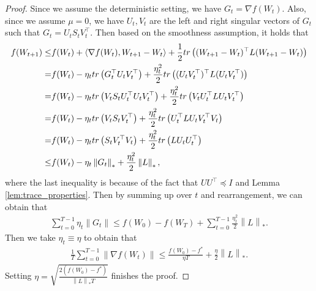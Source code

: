 \documentclass[10pt,a4paper]{amsart}
\newcommand{\Norm}[1]{\left\|#1\right\|}
\newcommand{\dotprod}[2]{\left\langle#1,#2\right\rangle}
\newcommand{\tr}[1]{{\rm tr}\left( #1 \right)}
\begin{document}
\begin{proof}
    Since we assume the deterministic setting, we have $G_t = \nabla f(W_t)$. Also, since we assume $\mu = 0$, we have $U_t,V_t$ are the left and right singular vectors of $G_t$ such that $G_t = U_t S_t V_t^\top$. Then based on the smoothness assumption, it holds that
    \begin{align*}
        f(W_{t+1}) \le& f(W_t) + \dotprod{\nabla f(W_t)}{W_{t+1} - W_t} + \frac{1}{2} \tr{(W_{t+1} - W_t)^\top L (W_{t+1} - W_t)} \\
        =& f(W_t) - \eta_t \tr{G_t^\top U_tV_t^\top} + \frac{\eta_t^2}{2} \tr{(U_tV_t^\top)^\top L (U_tV_t^\top)} \\
        =& f(W_t) - \eta_t \tr{V_t S_t U_t^\top U_tV_t^\top} + \frac{\eta_t^2}{2} \tr{V_t U_t^\top L U_tV_t^\top } \\
        =& f(W_t) - \eta_t \tr{V_t S_t V_t^\top} + \frac{\eta_t^2}{2} \tr{U_t^\top L U_tV_t^\top V_t } \\
        =& f(W_t) - \eta_t \tr{S_t V_t^\top V_t } + \frac{\eta_t^2}{2} \tr{ L U_t U_t^\top} \\
        \le& f(W_t) - \eta_t \Norm{G_t}_* + \frac{\eta_t^2}{2} \Norm{L}_* ,
    \end{align*}
    where the last inequality is because of the fact that $UU^\top \preceq I$ and Lemma \ref{lem:trace_properties}. Then by summing up over $t$ and rearrangement, we can obtain that
    \begin{align*}
        \sum_{t=0}^{T-1} \eta_t \Norm{G_t} \le f(W_0) - f(W_T) + \sum_{t=0}^{T-1} \frac{\eta_t^2}{2} \Norm{L}_* .
    \end{align*}
    Then we take $\eta_t \equiv \eta$ to obtain that
    \begin{align*}
        \frac{1}{T} \sum_{t=0}^{T-1} \Norm{\nabla f(W_t)} \le \frac{f(W_0) - f^*}{\eta T} + \frac{\eta}{2} \Norm{L}_*.
    \end{align*}
    Setting $\eta = \sqrt{\frac{2(f(W_0) - f^*)}{ \Norm{L}_* T}}$ finishes the proof.
\end{proof}
\end{document}
